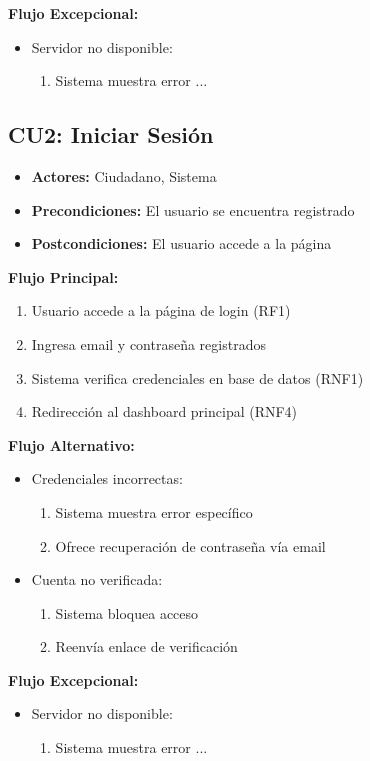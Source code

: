 \begin{multicols}{2}
\textbf{Flujo Excepcional:}
\begin{itemize}
    \item Servidor no disponible:
    \begin{enumerate}
        \item Sistema muestra error ...
    \end{enumerate}
\end{itemize}

\subsection*{CU2: Iniciar Sesión}
\begin{itemize}
    \item \textbf{Actores:} Ciudadano, Sistema
    \item \textbf{Precondiciones:} El usuario se encuentra registrado 
    \item \textbf{Postcondiciones:} El usuario accede a la página
\end{itemize}
\textbf{Flujo Principal:}
\begin{enumerate}
    \item Usuario accede a la página de login (RF1)
    \item Ingresa email y contraseña registrados
    \item Sistema verifica credenciales en base de datos (RNF1)
    \item Redirección al dashboard principal (RNF4)
\end{enumerate}

\textbf{Flujo Alternativo:}
\begin{itemize}
    \item Credenciales incorrectas:
    \begin{enumerate}
        \item Sistema muestra error específico
        \item Ofrece recuperación de contraseña vía email
    \end{enumerate}
    \item Cuenta no verificada:
    \begin{enumerate}
        \item Sistema bloquea acceso
        \item Reenvía enlace de verificación
    \end{enumerate}
\end{itemize}

\textbf{Flujo Excepcional:}
\begin{itemize}
    \item Servidor no disponible:
    \begin{enumerate}
        \item Sistema muestra error ...
    \end{enumerate}
\end{itemize}


\end{multicols}
